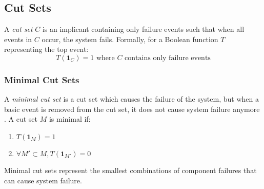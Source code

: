 \subsection{Cut Sets}
A \emph{cut set} $C$ is an implicant containing only failure events such that when all events in $C$ occur, the system fails. Formally, for a Boolean function $T$ representing the top event:
\[
T(\mathbf{1}_C) = 1 \text{ where } C \text{ contains only failure events}
\]

\subsubsection{Minimal Cut Sets}
A \emph{minimal cut set} is a cut set which causes the failure of the system, but when a basic event is removed from the cut set, it does not cause system failure anymore \cite{amicucci_reliability_2023}. A cut set $M$ is minimal if:
\begin{enumerate}
  \item $T(\mathbf{1}_M) = 1$
  \item $\forall M' \subset M, T(\mathbf{1}_{M'}) = 0$
\end{enumerate}
Minimal cut sets represent the smallest combinations of component failures that can cause system failure.

